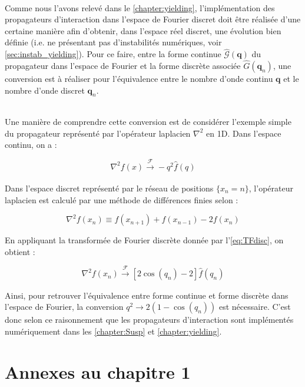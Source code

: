 \label{sec:impl_disc_propag}

\subparagraph{}Comme nous l'avons relevé dans le \autoref{chapter:yielding}, l'implémentation des propagateurs d'interaction dans l'espace de Fourier discret doit être réalisée d'une certaine manière afin d'obtenir, dans l'espace réel discret, une évolution bien définie (i.e. ne présentant pas d'instabilités numériques, voir \autoref{sec:instab_yielding}). Pour ce faire, entre la forme continue $\hat{\mathcal{G}}(\mathbf{q})$ du propagateur dans l'espace de Fourier et la forme discrète associée $\hat{G}(\mathbf{q}_n)$, une conversion est à réaliser pour l'équivalence entre le nombre d'onde continu $\mathbf{q}$ et le nombre d'onde discret $\mathbf{q}_n$. 

\subparagraph{}Une manière de comprendre cette conversion est de considérer l'exemple simple du propagateur représenté par l'opérateur laplacien $\nabla^2$ en 1D. Dans l'espace continu, on a :

\begin{equation}
	\nabla^2 f(x) \xrightarrow[]{\mathcal{F}} -q^2 \hat{f}(q)
\end{equation}

\noindent Dans l'espace discret représenté par le réseau de positions $\{x_n = n\}$, l'opérateur laplacien est calculé par une méthode de différences finies selon :

\begin{equation}
	\nabla^2 f(x_n) \equiv f(x_{n+1})+f(x_{n-1})-2f(x_n)
\end{equation}

\noindent En appliquant la transformée de Fourier discrète donnée par l'\autoref{eq:TFdisc}, on obtient :

\begin{equation}
	\nabla^2 f(x_n) \xrightarrow[]{\mathcal{F}} [2\cos(q_n)-2]\hat{f}(q_n)
\end{equation}

\noindent Ainsi, pour retrouver l'équivalence entre forme continue et forme discrète dans l'espace de Fourier, la conversion $q^2 \rightarrow 2(1-\cos (q_n))$ est nécessaire. C'est donc selon ce raisonnement que les propagateurs d'interaction sont implémentés numériquement dans les \autoref{chapter:Susp} et \autoref{chapter:yielding}.

\chapter{Annexes au chapitre 1}

